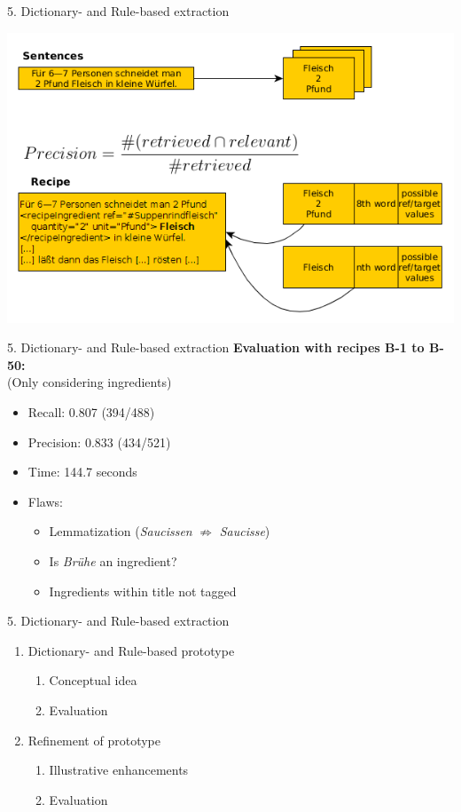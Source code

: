\documentclass[12pt]{beamer}
\begin{document}
\begin{frame}{5. Dictionary- and Rule-based extraction}
	\begin{center}
		\includegraphics[width=1\linewidth, height=1\textheight, keepaspectratio]{../../Images/precision}
	\end{center}
\end{frame}

\begin{frame}{5. Dictionary- and Rule-based extraction}
	\textbf{Evaluation with recipes B-1 to B-50:}\\
	\hspace{1cm}(Only considering ingredients)\\
	\begin{itemize}
		\item Recall: 0.807 (394/488)
		\item Precision: 0.833 (434/521)
		\item Time: 144.7 seconds
		\item Flaws:
		\begin{itemize}
			\item Lemmatization (\textit{Saucissen} $\not\Rightarrow$ \textit{Saucisse})
			\item Is \textit{Brühe} an ingredient?
			\item Ingredients within title not tagged
		\end{itemize}
	\end{itemize}
\end{frame}

\begin{frame}{5. Dictionary- and Rule-based extraction}
	\begin{enumerate}
		\item Dictionary- and Rule-based prototype
		\begin{enumerate}
			\item Conceptual idea
			\item Evaluation
		\end{enumerate}
		\item Refinement of prototype
		\begin{enumerate}
			\item Illustrative enhancements
			\item Evaluation
		\end{enumerate}
	\end{enumerate}
\end{frame}
\end{document}
